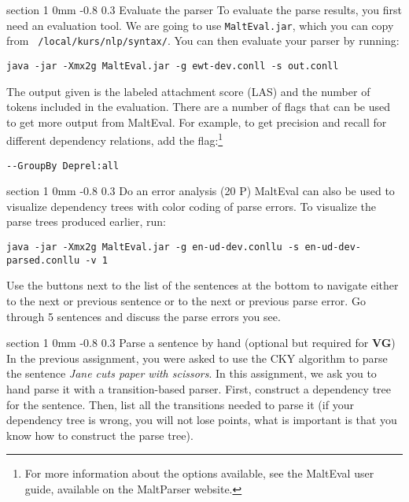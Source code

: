 \documentclass[11pt]{article}
\makeatletter
\newcommand{\newsec}[2]{\section{#1}\label{sec:#2}\noindent}
\renewcommand{\section}{\@startsection
{section}%
{1}%
{0mm}%
{-0.8\baselineskip}%
{0.3\baselineskip}%
{\bfseries\large}}%
\makeatother
\begin{document}
\newsec{Evaluate the parser}{eval}%
To evaluate the parse results, you first need an evaluation tool. We
are going to use {\tt MaltEval.jar}, which you can copy from {\tt
  /local/kurs/nlp/syntax/}. You can then evaluate your parser by
running:
\begin{small}
\begin{verbatim}
java -jar -Xmx2g MaltEval.jar -g ewt-dev.conll -s out.conll
\end{verbatim}
\end{small}
The output given is the labeled attachment score (LAS) and the number
of tokens included in the evaluation. There are a number of flags that
can be used to get more output from MaltEval. For example, to get
precision and recall for different dependency relations, add the
flag:\footnote{For more information about the options available, see
  the MaltEval user guide, available on the MaltParser website.}
\begin{small}
\begin{verbatim}
--GroupBy Deprel:all
\end{verbatim}
\end{small}

\newsec{Do an error analysis (20 P)}{err}%
MaltEval can also be used to visualize dependency trees with color
coding of parse errors. To visualize the parse trees produced earlier,
run:
\begin{small}
\begin{verbatim}
java -jar -Xmx2g MaltEval.jar -g en-ud-dev.conllu -s en-ud-dev-parsed.conllu -v 1
\end{verbatim}
\end{small}
Use the buttons next to the list of the sentences at the bottom to
navigate either to the next or previous sentence or to the next or
previous parse error.
Go through 5 sentences and discuss the parse errors you see.

\newsec{Parse a sentence by hand (optional but required for \textbf{VG})}{handparse}
In the previous assignment, you were asked to use the CKY algorithm to parse the sentence \textit{Jane cuts paper with scissors}. In this assignment, we ask you to hand parse it with a transition-based parser. First, construct a dependency tree for the sentence. Then, list all the transitions needed to parse it (if your dependency tree is wrong, you will not lose points, what is important is that you know how to construct the parse tree).
\end{document}

